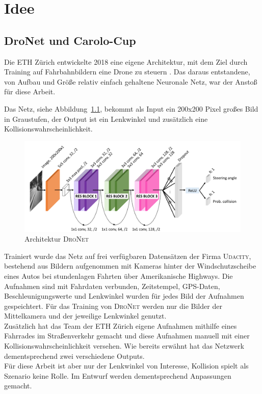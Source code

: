 %
\chapter{Idee}

\section{DroNet und Carolo-Cup}

Die ETH Zürich entwickelte 2018 eine eigene Architektur, mit dem Ziel durch Training auf Fahrbahnbildern eine Drone zu steuern \cite{Loquercio_2018}. 
Das daraus entstandene, von Aufbau und Größe relativ einfach gehaltene Neuronale Netz, war der Anstoß für diese Arbeit. 

Das Netz, siehe Abbildung~\ref{img:DroNet}, bekommt als Input ein 200x200 Pixel großes Bild in Graustufen, der Output ist ein Lenkwinkel und zusätzlich eine Kollisionswahrscheinlichkeit.\\

\begin{figure}[h]
	\centering
	\includegraphics[scale=0.5]{figures/Architecture-DRONET.png}
	\caption{Architektur \textsc{DroNet}}
	\label{img:DroNet}
\end{figure}

Trainiert wurde das Netz auf frei verfügbaren Datensätzen der Firma \textsc{Udacity}, bestehend aus Bildern aufgenommen mit Kameras hinter der Windschutzscheibe eines Autos bei stundenlagen Fahrten über Amerikanische Highways. Die Aufnahmen sind mit Fahrdaten verbunden, Zeitstempel, GPS-Daten, Beschleunigungswerte und Lenkwinkel wurden für jedes Bild der Aufnahmen gespeichtert. Für das Training von \textsc{DroNet} werden nur die Bilder der Mittelkamera und der jeweilige Lenkwinkel genutzt.\\
Zusätzlich hat das Team der ETH Zürich eigene Aufnahmen mithilfe eines Fahrrades im Straßenverkehr gemacht und diese Aufnahmen manuell mit einer Kollisionswahrscheinlichkeit versehen. Wie bereits erwähnt hat das Netzwerk dementsprechend zwei verschiedene Outputs.\\
Für diese Arbeit ist aber nur der Lenkwinkel von Interesse, Kollision spielt als Szenario keine Rolle. Im Entwurf werden dementsprechend Anpassungen gemacht.

